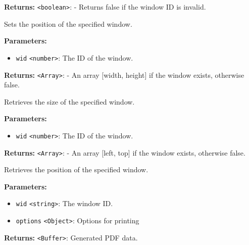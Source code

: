 \documentclass[12pt,a4paper]{article}
\begin{document}
\noindent \textbf{Returns:} \texttt{<boolean>}: - Returns false if the window ID is invalid.

\noindent Sets the position of the specified window.

\vspace{5mm}
\noindent {}


\noindent \textbf{Parameters:}
\begin{itemize}
  \item \texttt{wid} \texttt{<number>}: The ID of the window.
\end{itemize}

\noindent \textbf{Returns:} \texttt{<Array>}: - An array [width, height] if the window exists, otherwise false.

\noindent Retrieves the size of the specified window.

\vspace{5mm}
\noindent {}


\noindent \textbf{Parameters:}
\begin{itemize}
  \item \texttt{wid} \texttt{<number>}: The ID of the window.
\end{itemize}

\noindent \textbf{Returns:} \texttt{<Array>}: - An array [left, top] if the window exists, otherwise false.

\noindent Retrieves the position of the specified window.

\vspace{5mm}
\noindent {}


\noindent \textbf{Parameters:}
\begin{itemize}
  \item \texttt{wid} \texttt{<string>}: The window ID.
  \item \texttt{options} \texttt{<Object>}: Options for printing
\end{itemize}

\noindent \textbf{Returns:} \texttt{<Buffer>}: Generated PDF data.
\end{document}
